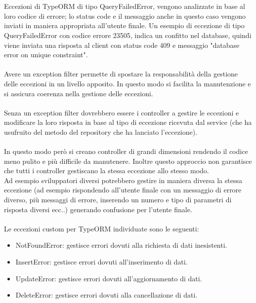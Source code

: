 \\\\
Eccezioni di TypeORM di tipo QueryFailedError, vengono analizzate in base al loro codice di errore; 
lo status code e il messaggio anche in questo caso vengono inviati in maniera appropriata all'utente finale.
Un esempio di eccezione di tipo QueryFailedError con codice errore 23505, indica un confitto nel database, quindi
viene inviata una risposta al client con status code 409 e messaggio "database error on unique constraint".
\\\\
Avere un exception filter permette di spostare la responsabilità della gestione delle eccezioni in un livello
apposito. In questo modo si facilita la manutenzione e si assicura coerenza nella gestione delle eccezioni.
\\\\
Senza un exception filter dovrebbero essere i controller a gestire le eccezioni e modificare la loro risposta
in base al tipo di eccezione ricevuta dal service (che ha usufruito del metodo del repository che ha lanciato
l'eccezione).
\\\\
In questo modo però si creano controller di grandi dimensioni rendendo il codice meno pulito e più difficile
da manutenere. Inoltre questo approccio non garantisce che tutti i controller gestiscano la stessa eccezione
allo stesso modo. 
\\
Ad esempio sviluppatori diversi potrebbero gestire in maniera diversa la stessa eccezione (ad esempio rispondendo
all'utente finale con un messaggio di errore diverso,
più messaggi di errore, inserendo un numero e tipo di parametri di risposta diversi ecc..)
generando confusione per l'utente finale.
\\\\
Le eccezioni custom per TypeORM individuate sono le seguenti:
\begin{itemize}
    \item NotFoundError: gestisce errori dovuti alla richiesta di dati inesistenti.
    \item InsertError: gestisce errori dovuti all'inserimento di dati.
    \item UpdateError: gestisce errori dovuti all'aggiornamento di dati.
    \item DeleteError: gestisce errori dovuti alla cancellazione di dati.
\end{itemize}
\leavevmode\newline

